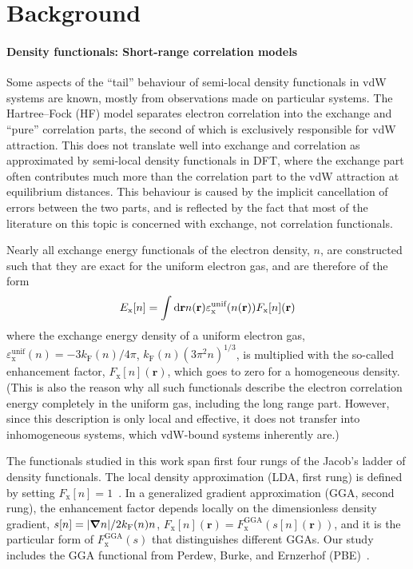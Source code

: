 \section{Background}

\paragraph{Density functionals: Short-range correlation models}

Some aspects of the ``tail'' behaviour of semi-local density functionals in vdW systems are known, mostly from observations made on particular systems.
The Hartree--Fock (HF) model separates electron correlation into the exchange and ``pure'' correlation parts, the second of which is exclusively responsible for vdW attraction.
This does not translate well into exchange and correlation as approximated by semi-local density functionals in DFT, where the exchange part often contributes much more than the correlation part to the vdW attraction at equilibrium distances.
This behaviour is caused by the implicit cancellation of errors between the two parts, and is reflected by the fact that most of the literature on this topic is concerned with exchange, not correlation functionals.

Nearly all exchange energy functionals of the electron density, $n$, are constructed such that they are exact for the uniform electron gas, and are therefore of the form
\begin{equation}
  E_\mathrm x[n]=\int\mathrm d\mathbf rn(\mathbf r)\varepsilon^\text{unif}_\text x(n(\mathbf r))F_\mathrm x[n](\mathbf r)
  \label{eq:exchange-form}
\end{equation}
where the exchange energy density of a uniform electron gas, $\varepsilon^\text{unif}_\mathrm x(n)=-3k_\mathrm F(n)/4\pi$, $k_\mathrm F(n)(3\pi^2n)^{1/3}$, is multiplied with the so-called enhancement factor, $F_\mathrm x[n](\mathbf r)$, which goes to zero for a homogeneous density.
(This is also the reason why all such functionals describe the electron correlation energy completely in the uniform gas, including the long range part.
However, since this description is only local and effective, it does not transfer into inhomogeneous systems, which vdW-bound systems inherently are.)

The functionals studied in this work span first four rungs of the Jacob's ladder of density functionals.
The local density approximation (LDA, first rung) is defined by setting $F_\mathrm x[n]=1$~\cite{DiracMPCPS30}.
In a generalized gradient approximation (GGA, second rung), the enhancement factor depends locally on the dimensionless density gradient, $s[n]=\lvert\boldsymbol\nabla n\rvert/2k_\text F(n)n$, $F_\mathrm x[n](\mathbf r)=F^\text{GGA}_\mathrm x(s[n](\mathbf r))$, and it is the particular form of $F^\text{GGA}_\mathrm x(s)$ that distinguishes different GGAs.
Our study includes the GGA functional from Perdew, Burke, and Ernzerhof (PBE)~\cite{PerdewPRL96}.

